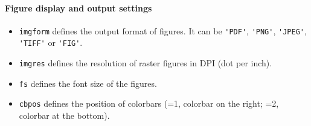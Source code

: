 \documentclass[twoside,a4paper]{article}
\begin{document}
\paragraph{Figure display and output settings}
\begin{itemize}[leftmargin=*]
\setlength\itemsep{2ex}
\item \verb|imgform| defines the output format of figures. It can be \verb|'PDF'|, \verb|'PNG'|, \verb|'JPEG'|, \verb|'TIFF'| or \verb|'FIG'|.

\item \verb|imgres| defines the resolution of raster figures in DPI (dot per inch).

\item \verb|fs| defines the font size of the figures.

\item \verb|cbpos| defines the position of colorbars (=1, colorbar on the right; =2, colorbar at the bottom).
\end{itemize}
\end{document}
